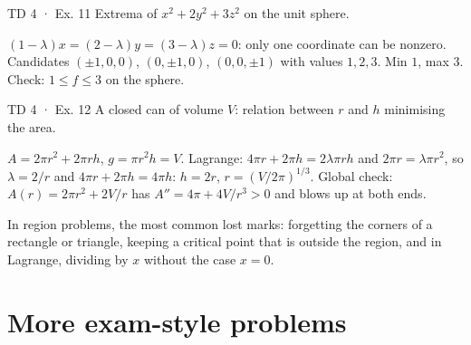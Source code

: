 \begin{problem}{TD 4 · Ex. 11}
Extrema of $x^2+2y^2+3z^2$ on the unit sphere.
\end{problem}
\begin{solution}
$(1-\lambda)x=(2-\lambda)y=(3-\lambda)z=0$: only one coordinate can be nonzero. Candidates
$(\pm1,0,0)$, $(0,\pm1,0)$, $(0,0,\pm1)$ with values $1,2,3$. Min $1$, max $3$. Check:
$1\le f\le3$ on the sphere.
\end{solution}

\begin{problem}{TD 4 · Ex. 12}\label{p:can}
A closed can of volume $V$: relation between $r$ and $h$ minimising the area.
\end{problem}
\begin{solution}
$A=2\pi r^2+2\pi rh$, $g=\pi r^2h=V$. Lagrange: $4\pi r+2\pi h=2\lambda\pi rh$ and $2\pi r=\lambda\pi r^2$,
so $\lambda=2/r$ and $4\pi r+2\pi h=4\pi h$: $h=2r$, $r=(V/2\pi)^{1/3}$. Global check:
$A(r)=2\pi r^2+2V/r$ has $A''=4\pi+4V/r^3>0$ and blows up at both ends.
\end{solution}

\begin{trap}
In region problems, the most common lost marks: forgetting the corners of a rectangle or
triangle, keeping a critical point that is outside the region, and in Lagrange, dividing by
$x$ without the case $x=0$.
\end{trap}

\section{More exam-style problems}

